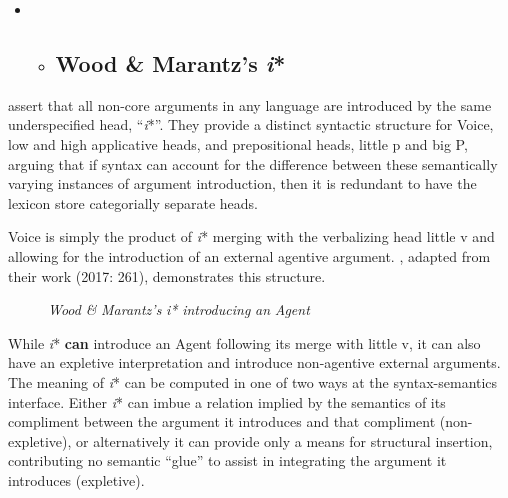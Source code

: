 \documentclass[output=paper,modfonts,nonflat]{langsci/langscibook}
\begin{document}
\begin{itemize}
\item \begin{itemize}
\item \subsection{Wood \& Marantz’s \textit{i}*}
\end{itemize}
\end{itemize}
\begin{styleDefault}
\citet{WoodMarantz2017} assert that all non-core arguments in any language are introduced by the same underspecified head, “\textit{i}*”. They provide a distinct syntactic structure for Voice, low and high applicative heads, and prepositional heads, little p and big P, arguing that if syntax can account for the difference between these semantically varying instances of argument introduction, then it is redundant to have the lexicon store categorially separate heads. 
\end{styleDefault}

\begin{styleDefault}
Voice is simply the product of \textit{i}* merging with the verbalizing head little v and allowing for the introduction of an external agentive argument. , adapted from their work (2017: 261), demonstrates this structure.
\end{styleDefault}

\begin{styleDefault}
    
 
\end{styleDefault}

\begin{styleDefault}\begin{figure}
\caption{\textit{Wood} \textit{\&} \textit{Marantz’s} \textit{i*} \textit{introducing} \textit{an} \textit{Agent}} 
\label{fig:key:1}
\end{figure}\end{styleDefault}

\begin{styleDefault}
While \textit{i}* \textbf{can} introduce an Agent following its merge with little v, it can also have an expletive interpretation and introduce non-agentive external arguments. The meaning of \textit{i}* can be computed in one of two ways at the syntax-semantics interface. Either \textit{i}* can imbue a relation implied by the semantics of its compliment between the argument it introduces and that compliment (non-expletive), or alternatively it can provide only a means for structural insertion, contributing no semantic “glue” to assist in integrating the argument it introduces (expletive). 
\end{styleDefault}
\end{document}
